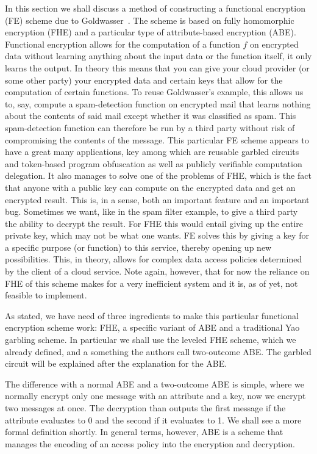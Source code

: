 \documentclass[11pt, a4paper]{article}
\begin{document}
In this section we shall discuss a method of constructing a functional encryption (FE) scheme due to Goldwasser~\cite{goldwasser2013reusable}.
The scheme is based on fully homomorphic encryption (FHE) and a particular type of attribute-based encryption (ABE).
Functional encryption allows for the computation of a function $f$ on encrypted data without learning anything about the input data or the function itself, it only learns the output.
In theory this means that you can give your cloud provider (or some other party) your encrypted data and certain keys that allow for the computation of certain functions.
To reuse Goldwasser's example, this allows us to, say, compute a spam-detection function on encrypted mail that learns nothing about the contents of said mail except whether it was classified as spam.
This spam-detection function can therefore be run by a third party without risk of compromising the contents of the message.
This particular FE scheme appears to have a great many applications, key among which are reusable garbled circuits and token-based program obfuscation as well as publicly verifiable computation delegation.
It also manages to solve one of the problems of FHE, which is the fact that anyone with a public key can compute on the encrypted data and get an encrypted result.
This is, in a sense, both an important feature and an important bug.
Sometimes we want, like in the spam filter example, to give a third party the ability to decrypt the result.
For FHE this would entail giving up the entire private key, which may not be what one wants.
FE solves this by giving a key for a specific purpose (or function) to this service, thereby opening up new possibilities.
This, in theory, allows for complex data access policies determined by the client of a cloud service.
Note again, however, that for now the reliance on FHE of this scheme makes for a very inefficient system and it is, as of yet, not feasible to implement.

As stated, we have need of three ingredients to make this particular functional encryption scheme work: FHE, a specific variant of ABE and a traditional Yao garbling scheme.
In particular we shall use the leveled FHE scheme, which we already defined,  and a something the authors call two-outcome ABE.
The garbled circuit will be explained after the explanation for the ABE.

The difference with a normal ABE and a two-outcome ABE is simple, where we normally encrypt only one message with an attribute and a key, now we encrypt two messages at once.
The decryption than outputs the first message if the attribute evaluates to 0 and the second if it evaluates to 1.
We shall see a more formal definition shortly.
In general terms, however, ABE is a scheme that manages the encoding of an access policy into the encryption and decryption.
\end{document}
